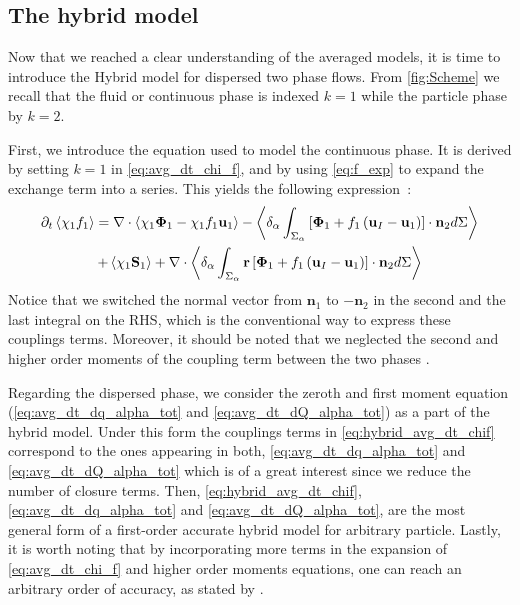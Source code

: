 \subsection{The hybrid model}

Now that we reached a clear understanding of the averaged models, it is time to introduce the Hybrid model for dispersed two phase flows. 
From \ref{fig:Scheme} we recall that the fluid or continuous phase is indexed $k=1$ while the particle phase by $k=2$.  

First, we introduce the equation used to model the continuous phase. 
It is derived by setting $k = 1$ in \ref{eq:avg_dt_chi_f}, and by using \ref{eq:f_exp} to expand the exchange term into a series.
This yields the following expression~:
\begin{multline}
    \partial_t \left<\chi_1 f_1\right>
    = \mathbf{\nabla} \cdot \left<\chi_1 \mathbf{\Phi}_1 - \chi_1 f_1 \textbf{u}_1\right>
    - \left<\delta_\alpha \int_{\Sigma_\alpha}\left[
        \mathbf{\Phi}_1  
        + f_1
        \left(
            \textbf{u}_I
            - \textbf{u}_1
        \right)
    \right]
    \cdot \textbf{n}_2d\Sigma\right> \\
    + \left<\chi_1 \textbf{S}_1\right>
    +  \mathbf{\nabla} \cdot \left<\delta_\alpha \int_{\Sigma_\alpha} \textbf{r}\left[
        \mathbf{\Phi}_1
        + f_1
        \left(
            \textbf{u}_I
            - \textbf{u}_1
        \right)
    \right]
    \cdot \textbf{n}_2d\Sigma\right> 
    \label{eq:hybrid_avg_dt_chif}
\end{multline}
Notice that we switched the normal vector from $\textbf{n}_1$ to $-\textbf{n}_2$ in the second and the last integral on the RHS, which is the conventional way to express these couplings terms. 
Moreover, it should be noted that we neglected the second and higher order moments of the coupling term between the two phases \citep{jackson1997locally}.

Regarding the dispersed phase, we consider the zeroth and first moment equation (\ref{eq:avg_dt_dq_alpha_tot} and \ref{eq:avg_dt_dQ_alpha_tot}) as  a part of the hybrid model.
Under this form the couplings terms in \ref{eq:hybrid_avg_dt_chif} correspond to the ones appearing in both, \ref{eq:avg_dt_dq_alpha_tot} and \ref{eq:avg_dt_dQ_alpha_tot} which is of a great interest since we reduce the number of closure terms.
Then, \ref{eq:hybrid_avg_dt_chif}, \ref{eq:avg_dt_dq_alpha_tot} and \ref{eq:avg_dt_dQ_alpha_tot}, are the most general form of a first-order accurate hybrid model for arbitrary particle. 
Lastly, it is worth noting that by incorporating more terms in the expansion of \ref{eq:avg_dt_chi_f} and higher order moments equations, one can reach an arbitrary order of accuracy, as stated by \citet{zhang1997momentum}. 
